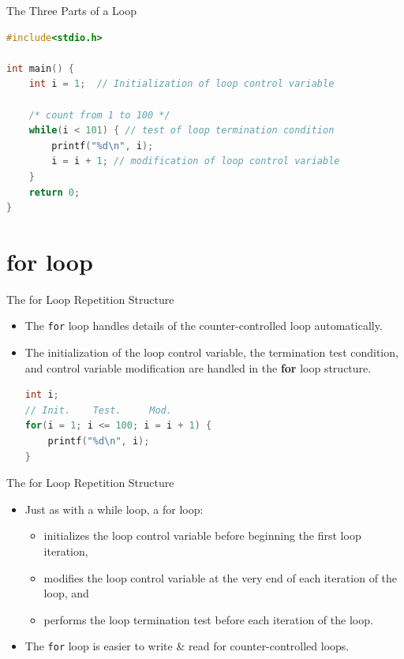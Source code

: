 \documentclass[graphics]{beamer}
\begin{document}
\begin{frame}[fragile]{The Three Parts of a Loop}
    \begin{lstlisting}[language=C,basicstyle=\footnotesize,keywordstyle=\color{blue},commentstyle=\color{green},showstringspaces=false,stringstyle=\color{red}]
#include<stdio.h>

int main() {
    int i = 1;  // Initialization of loop control variable
    
    /* count from 1 to 100 */
    while(i < 101) { // test of loop termination condition
        printf("%d\n", i);
        i = i + 1; // modification of loop control variable
    }
    return 0;
}
    \end{lstlisting}
\end{frame}

\section*{for loop}
\begin{frame}[fragile]{The for Loop Repetition Structure}
    \begin{itemize}
        \item The \texttt{for} loop handles details of the counter-controlled loop automatically.
        \item The initialization of the loop control variable, the termination test condition, and control variable modification are handled in the \textbf{for} loop structure.
\begin{lstlisting}[language=C,basicstyle=\footnotesize,keywordstyle=\color{blue},commentstyle=\color{green},showstringspaces=false,stringstyle=\color{red}]
int i;
// Init.    Test.     Mod.
for(i = 1; i <= 100; i = i + 1) {
    printf("%d\n", i);
}
\end{lstlisting}
    \end{itemize}
\end{frame}

\begin{frame}{The for Loop Repetition Structure}
    \begin{itemize}
        \item Just as with a while loop, a for loop:
        \begin{itemize}
            \item initializes the loop control variable before beginning the first loop iteration,
            \item modifies the loop control variable at the very end of each iteration of the loop, and
            \item performs the loop termination test before each iteration of the loop.
        \end{itemize}
        \item The \texttt{for} loop is easier to write \& read for counter-controlled loops.
    \end{itemize}
\end{frame}
\end{document}
